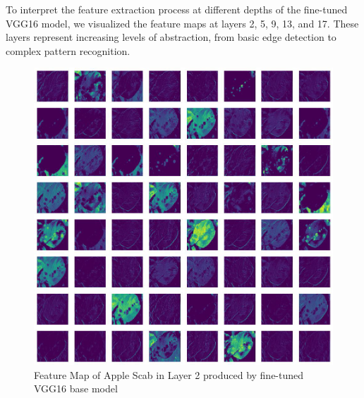 To interpret the feature extraction process at different depths of the fine-tuned VGG16 model, we visualized the feature maps at layers 2, 5, 9, 13, and 17. These layers represent increasing levels of abstraction, from basic edge detection to complex pattern recognition.\par\vspace{1em}

\begin{figure}
    \centering
    \includegraphics[width=0.75\linewidth]{graphics//chapter7/apple black rot fmap1.png}
    \caption{Feature Map of Apple Scab in Layer 2 produced by fine-tuned VGG16 base model}
    \label{fig:abr-fmap1}
\end{figure}

